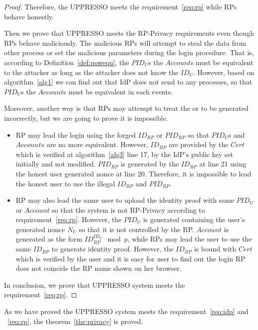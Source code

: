 \begin{appendices}
\begin{proof}
Therefore, the UPPRESSO meets the requirement~\ref{req:rp} while RPs behave honestly. 

Then we prove that UPPRESSO meets the RP-Privacy requirements even though RPs behave maliciously. The malicious RPs will attempt to steal the data from other process or set the malicious parameters during the login procedure. That is, according to Definition~\ref{def:powequ}, the $PID_U$s the $Account$s must be equivalent to the attacker as long as the attacker does not know the $ID_U$. However, based on algorithm~\ref{alg1} we can find out that IdP does not send  to any processes, so that $PID_U$s the $Account$s must be equivalent in each events. 

Moreover, another way is that RPs may attempt to treat the  or  to be generated incorrectly, but we are going to prove it is impossible.
\begin{itemize}
\item RP may lead the login using the forged $ID_{RP}$ or $PID_{RP}$ so that $PID_U$s and $Accounts$ are no more equivalent. However, $ID_{RP}$ are provided by the $Cert$ which is verified at algorithm~\ref{alg3} line 17, by the IdP's public key set initially and not modified.  $PID_{RP}$ is generated by the $ID_{RP}$ at line 21 using the honest user generated nonce at line 20. Therefore, it is impossible to lead the honest user to use the illegal $ID_{RP}$ and $PID_{RP}$.
\item RP may also lead the same user to upload the identity proof with same $PID_U$ or $Account$ so that the system is not RP-Privacy according to requirement~\ref{req:rp}. However, the $PID_U$ is generated containing the user's generated nonce $N_U$ so that it is not controlled by the RP. $Account$ is generated as the form $ID_{RP}^{ID_U} \mod p$, while RPs may lead the user to use the same $ID_{RP}$ to generate identity proof. However, the $ID_{RP}$ is bound with $Cert$ which is verified by the user and it is easy for user to find out the login RP  does not coincide the RP name shown on her browser. 
\end{itemize}

In conclusion, we prove that UPPRESSO system meets the requirement~\ref{req:rp}. 
\end{proof}
 As we have proved the UPPRESSO system meets the requirement~\ref{req:idp} and ~\ref{req:rp}, the theorem~\ref{the:privacy} is proved.


\end{appendices}